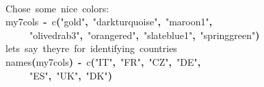 \documentclass[a4paper]{article}
\newcommand{\hlfunctioncall}[1]{\textcolor[rgb]{1,0,0}{#1}}%
\newcommand{\hlstring}[1]{\textcolor[rgb]{0.6,0.6,1}{#1}}%
\newcommand{\hlkeyword}[1]{\textcolor[rgb]{0,0,0}{\textbf{#1}}}%
\newcommand{\hlcomment}[1]{\textcolor[rgb]{0.8,0.8,0.8}{#1}}%
\newcommand{\hlassignement}[1]{\textcolor[rgb]{0.215686274509804,0.215686274509804,0.384313725490196}{\textbf{#1}}}%
\newcommand{\hlsymbol}[1]{\textcolor[rgb]{0,0,0}{#1}}%
\newcommand{\hlprompt}[1]{\textcolor[rgb]{0,0,0}{#1}}%
\newcommand{\hlstd}[1]{\textcolor[rgb]{0,0,0}{#1}}%
\newenvironment{Houtput}{\raggedright}{%
%
}
\begin{document}
\begin{Houtput}
\hspace*{\fill}\\
\hlstd{}\ttfamily\noindent
\hlprompt{\usebox{\hlnormalsizeboxgreaterthan}{\ }}\hlcomment{\usebox{\hlnormalsizeboxhash}{\ }Chose{\ }some{\ }nice{\ }colors:}\mbox{}
\normalfont
\hspace*{\fill}\\
\hlstd{}\ttfamily\noindent
\hlprompt{\usebox{\hlnormalsizeboxgreaterthan}{\ }}\hlsymbol{my7cols}{\ }\hlassignement{\usebox{\hlnormalsizeboxlessthan}-}{\ }\hlfunctioncall{c}\hlkeyword{(}\hlstring{"gold"}\hlkeyword{,}{\ }\hlstring{"darkturquoise"}\hlkeyword{,}{\ }\hlstring{"maroon1"}\hlkeyword{,}\hspace*{\fill}\\
\hlstd{}\hlprompt{{\ }}{\ }{\ }{\ }{\ }\hlstring{"olivedrab3"}\hlkeyword{,}{\ }\hlstring{"orangered"}\hlkeyword{,}{\ }\hlstring{"slateblue1"}\hlkeyword{,}{\ }\hlstring{"springgreen"}\hlkeyword{)}\mbox{}
\normalfont
\hspace*{\fill}\\
\hlstd{}\ttfamily\noindent
\hlprompt{\usebox{\hlnormalsizeboxgreaterthan}{\ }}\hlcomment{\usebox{\hlnormalsizeboxhash}{\ }let\usebox{\hlnormalsizeboxsinglequote}s{\ }say{\ }they\usebox{\hlnormalsizeboxsinglequote}re{\ }for{\ }identifying{\ }countries}\mbox{}
\normalfont
\hspace*{\fill}\\
\hlstd{}\ttfamily\noindent
\hlprompt{\usebox{\hlnormalsizeboxgreaterthan}{\ }}\hlfunctioncall{names}\hlkeyword{(}\hlsymbol{my7cols}\hlkeyword{)}{\ }\hlassignement{\usebox{\hlnormalsizeboxlessthan}-}{\ }\hlfunctioncall{c}\hlkeyword{(}\hlstring{"IT"}\hlkeyword{,}{\ }\hlstring{"FR"}\hlkeyword{,}{\ }\hlstring{"CZ"}\hlkeyword{,}{\ }\hlstring{"DE"}\hlkeyword{,}\hspace*{\fill}\\
\hlstd{}\hlprompt{{\ }}{\ }{\ }{\ }{\ }\hlstring{"ES"}\hlkeyword{,}{\ }\hlstring{"UK"}\hlkeyword{,}{\ }\hlstring{"DK"}\hlkeyword{)}\mbox{}
\normalfont
\hspace*{\fill}\\
\hlstd{}
\end{Houtput}
\end{document}
